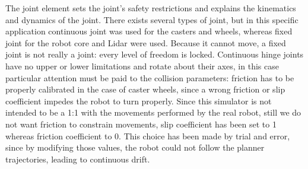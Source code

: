 

The joint element sets the joint's safety restrictions and explains the kinematics and dynamics of the joint. There exists several types of joint, but in this specific application continuous joint was used for the casters and wheels,  whereas fixed joint for the robot core and Lidar were used.  Because it cannot move, a fixed joint is not really a joint: every level of freedom is locked. Continuous hinge joints have no upper or lower limitations and rotate about their axes, in this case particular attention must be paid to the collision parameters: friction has to be properly calibrated in the case of caster wheels, since a wrong friction or slip coefficient impedes the robot to turn properly. Since this simulator is not intended to be a 1:1 with the movements performed by the real robot, still we do not want friction to constrain movements, slip coefficient has been set to 1 whereas friction coefficient to 0. This choice has been made by trial and error, since by modifying those values, the robot could not follow the planner trajectories, leading to continuous drift.



